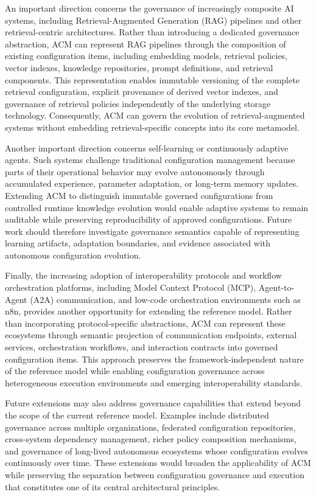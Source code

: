 \documentclass[10pt]{article}
\begin{document}
An important direction concerns the governance of increasingly composite AI systems, including Retrieval-Augmented Generation (RAG) pipelines and other retrieval-centric architectures. Rather than introducing a dedicated governance abstraction, ACM can represent RAG pipelines through the composition of existing configuration items, including embedding models, retrieval policies, vector indexes, knowledge repositories, prompt definitions, and retrieval components. This representation enables immutable versioning of the complete retrieval configuration, explicit provenance of derived vector indexes, and governance of retrieval policies independently of the underlying storage technology. Consequently, ACM can govern the evolution of retrieval-augmented systems without embedding retrieval-specific concepts into its core metamodel.

Another important direction concerns self-learning or continuously adaptive agents. Such systems challenge traditional configuration management because parts of their operational behavior may evolve autonomously through accumulated experience, parameter adaptation, or long-term memory updates. Extending ACM to distinguish immutable governed configurations from controlled runtime knowledge evolution would enable adaptive systems to remain auditable while preserving reproducibility of approved configurations. Future work should therefore investigate governance semantics capable of representing learning artifacts, adaptation boundaries, and evidence associated with autonomous configuration evolution.

Finally, the increasing adoption of interoperability protocols and workflow orchestration platforms, including Model Context Protocol (MCP), Agent-to-Agent (A2A) communication, and low-code orchestration environments such as n8n, provides another opportunity for extending the reference model. Rather than incorporating protocol-specific abstractions, ACM can represent these ecosystems through semantic projection of communication endpoints, external services, orchestration workflows, and interaction contracts into governed configuration items. This approach preserves the framework-independent nature of the reference model while enabling configuration governance across heterogeneous execution environments and emerging interoperability standards.

Future extensions may also address governance capabilities that extend beyond the scope of the current reference model. Examples include distributed governance across multiple organizations, federated configuration repositories, cross-system dependency management, richer policy composition mechanisms, and governance of long-lived autonomous ecosystems whose configuration evolves continuously over time. These extensions would broaden the applicability of ACM while preserving the separation between configuration governance and execution that constitutes one of its central architectural principles.
\end{document}
